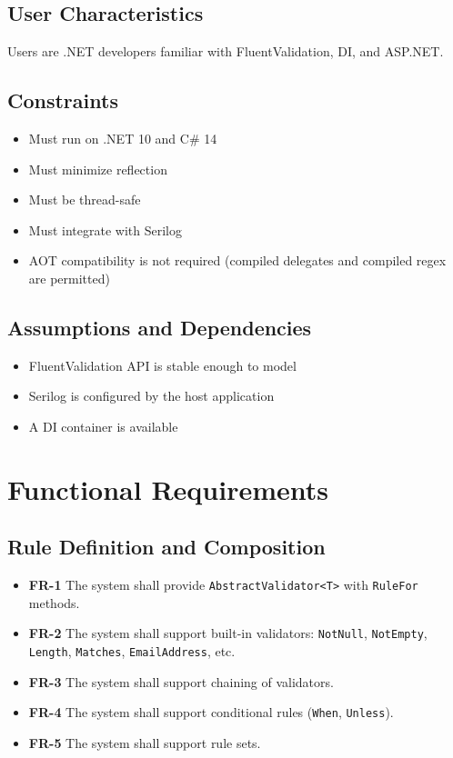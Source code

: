 \documentclass[12pt,technote]{IEEEtran}
\begin{document}
\subsection{User Characteristics}
Users are .NET developers familiar with FluentValidation, DI, and ASP.NET.

\subsection{Constraints}
\begin{itemize}[noitemsep]
    \item Must run on .NET 10 and C\# 14
    \item Must minimize reflection
    \item Must be thread-safe
    \item Must integrate with Serilog
    \item AOT compatibility is not required (compiled delegates and compiled regex are permitted)
\end{itemize}

\subsection{Assumptions and Dependencies}
\begin{itemize}[noitemsep]
    \item FluentValidation API is stable enough to model
    \item Serilog is configured by the host application
    \item A DI container is available
\end{itemize}

\section{Functional Requirements}

\subsection{Rule Definition and Composition}
\begin{itemize}[noitemsep]
    \item \textbf{FR-1} The system shall provide \texttt{AbstractValidator<T>} with \texttt{RuleFor} methods.
    \item \textbf{FR-2} The system shall support built-in validators: \texttt{NotNull}, \texttt{NotEmpty}, \texttt{Length}, \texttt{Matches}, \texttt{EmailAddress}, etc.
    \item \textbf{FR-3} The system shall support chaining of validators.
    \item \textbf{FR-4} The system shall support conditional rules (\texttt{When}, \texttt{Unless}).
    \item \textbf{FR-5} The system shall support rule sets.
\end{itemize}
\end{document}

